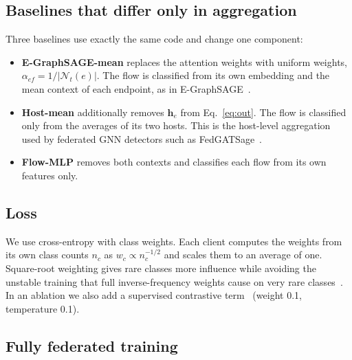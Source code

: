 \documentclass[pdflatex,sn-mathphys-num]{sn-jnl}
\begin{document}
\subsection{Baselines that differ only in aggregation}\label{sec:baselines}

Three baselines use exactly the same code and change one component:
\begin{itemize}
\item \textbf{E-GraphSAGE-mean} replaces the attention weights with uniform weights, $\alpha_{ef}=1/|\mathcal{N}_t(e)|$. The flow is classified from its own embedding and the mean context of each endpoint, as in E-GraphSAGE~\cite{lo2022egraphsage}.
\item \textbf{Host-mean} additionally removes $\mathbf{h}_e$ from Eq.~\eqref{eq:out}. The flow is classified only from the averages of its two hosts. This is the host-level aggregation used by federated GNN detectors such as FedGATSage~\cite{altfaily2025fedgatsage}.
\item \textbf{Flow-MLP} removes both contexts and classifies each flow from its own features only.
\end{itemize}

\subsection{Loss}\label{sec:loss}

We use cross-entropy with class weights. Each client computes the weights from its own class counts $n_c$ as $w_c\propto n_c^{-1/2}$ and scales them to an average of one. Square-root weighting gives rare classes more influence while avoiding the unstable training that full inverse-frequency weights cause on very rare classes~\cite{johnson2019imbalance,cui2019classbalanced}. In an ablation we also add a supervised contrastive term~\cite{khosla2020supcon} (weight 0.1, temperature 0.1).

\subsection{Fully federated training}\label{sec:fed}
\end{document}
